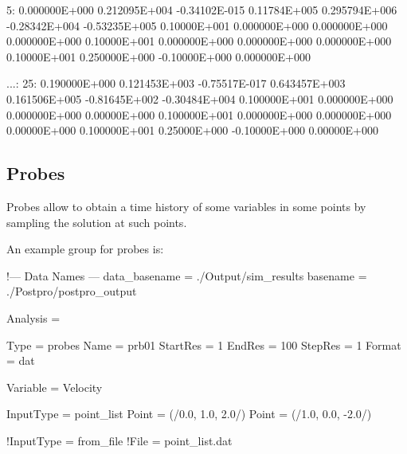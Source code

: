 \begin{inputfile}
  5: 0.000000E+000    0.212095E+004    -0.34102E-015  0.11784E+005  
     0.295794E+006    -0.28342E+004    -0.53235E+005  0.10000E+001  
     0.000000E+000    0.000000E+000    0.000000E+000  0.10000E+001  
     0.000000E+000    0.000000E+000    0.000000E+000  0.10000E+001  
     0.250000E+000    -0.10000E+000    0.000000E+000
  
...:
  25: 0.190000E+000  0.121453E+003 -0.75517E-017  0.643457E+003  
      0.161506E+005  -0.81645E+002 -0.30484E+004  0.100000E+001  
      0.000000E+000  0.000000E+000  0.00000E+000  0.100000E+001  
      0.000000E+000  0.000000E+000  0.00000E+000  0.100000E+001  
      0.25000E+000   -0.10000E+000  0.00000E+000
\end{inputfile}



\subsection{Probes}

Probes allow to obtain a time history of some variables in some points by sampling the solution at such points. 

An example  group for probes is:

\begin{inputfile}[frame=single, caption={dust\_post.in for probes}, label={file:dust_post.in_probes}]
!--- Data Names ---
data_basename = ./Output/sim_results
basename =     ./Postpro/postpro_output

Analysis = {

Type = probes
Name = prb01
StartRes = 1
EndRes   = 100 
StepRes  = 1
Format = dat

Variable = Velocity

InputType = point_list
Point = (/0.0, 1.0, 2.0/)
Point = (/1.0, 0.0, -2.0/)

!InputType = from_file
!File = point_list.dat

}
\end{inputfile}

